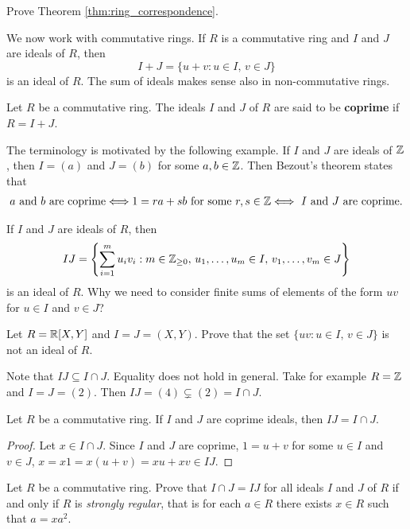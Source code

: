 \begin{exercise}
    Prove Theorem \ref{thm:ring_correspondence}.
\end{exercise}


We now work with commutative rings. 
If $R$ is a commutative ring and $I$ and $J$ are ideals of $R$, then
\[
I+J=\{u+v:u\in I,\,v\in J\}
\]
is an ideal of $R$. The sum of ideals makes sense also in non-commutative rings.  

\begin{definition}
	Let $R$ be a commutative ring. The ideals $I$ and $J$ of $R$ are said to be
	\textbf{coprime} if $R=I+J$.  
\end{definition}

The terminology is motivated by the following example. If $I$ and $J$ are
ideals of $\mathbb{Z}$, then $I=(a)$ and $J=(b)$ for some $a,b\in\mathbb{Z}$. Then Bezout's theorem 
states that 
\begin{align*}
\text{$a$ and $b$ are coprime}
\Longleftrightarrow 1=ra+sb\text{ for some $r,s\in\mathbb{Z}$}
\Longleftrightarrow\text{ $I$ and $J$ are coprime.}
\end{align*}

If $I$ and $J$ are ideals of $R$, then 
\[
	IJ=\left\{\sum_{i=1}^mu_iv_i:m\in\mathbb{Z}_{\geq0},\,u_1,\dots,u_m\in I,\,v_1,\dots,v_m\in J\right\}
\]
is an ideal of $R$. 
Why we need to consider finite sums of elements of the form $uv$
for $u\in I$ and $v\in J$?

\begin{exercise}
    \label{xca:IJ}
    Let $R=\mathbb{R}[X,Y]$ and $I=J=(X,Y)$. Prove that the
    set $\{uv:u\in I,\,v\in J\}$ is not an ideal of $R$.
\end{exercise}

Note that $IJ\subseteq I\cap J$. Equality does not hold in general. Take
for example $R=\mathbb{Z}$ and $I=J=(2)$. Then $IJ=(4)\subsetneq (2)=I\cap J$. 

\begin{proposition}
Let $R$ be a commutative ring. If $I$ and $J$ are coprime ideals, then $IJ=I\cap J$. 	
\end{proposition}

\begin{proof}
Let $x\in I\cap J$. Since $I$ and $J$ are coprime, 
$1=u+v$ for some $u\in I$ and $v\in J$, 
$x=x1=x(u+v)=xu+xv\in IJ$. 	
\end{proof}

\begin{exercise}
\label{xca:strongly_regular}
    Let $R$ be a commutative ring. 
    Prove that $I\cap J=IJ$ 
    for all ideals $I$ and $J$ of $R$
    if and only if $R$ is \emph{strongly regular}, 
    that is  
    for each $a\in R$ there 
    exists $x\in R$ such that $a=xa^2$. 
\end{exercise}

